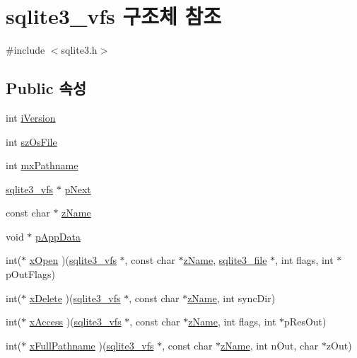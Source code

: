 \hypertarget{structsqlite3__vfs}{}\section{sqlite3\+\_\+vfs 구조체 참조}
\label{structsqlite3__vfs}


{\ttfamily \#include $<$sqlite3.\+h$>$}

\subsection*{Public 속성}
\begin{DoxyCompactItemize}
\item 
int \hyperlink{structsqlite3__vfs_a694dd264949bd163545fe174510ed019}{i\+Version}
\item 
int \hyperlink{structsqlite3__vfs_a549399081342d61134b6398562a0a997}{sz\+Os\+File}
\item 
int \hyperlink{structsqlite3__vfs_adb2d82c74891b00b5529fb94e7710135}{mx\+Pathname}
\item 
\hyperlink{structsqlite3__vfs}{sqlite3\+\_\+vfs} $\ast$ \hyperlink{structsqlite3__vfs_ae795a4417697ecd35163f6cdf0069073}{p\+Next}
\item 
const char $\ast$ \hyperlink{structsqlite3__vfs_a0f06a27ac2201ea04c0623ef19e5d73e}{z\+Name}
\item 
void $\ast$ \hyperlink{structsqlite3__vfs_a1ba832cf207fe59c1fc8eb436524bc35}{p\+App\+Data}
\item 
int($\ast$ \hyperlink{structsqlite3__vfs_ab106b445eb5d372266a1108fc982a9aa}{x\+Open} )(\hyperlink{structsqlite3__vfs}{sqlite3\+\_\+vfs} $\ast$, const char $\ast$\hyperlink{structsqlite3__vfs_a0f06a27ac2201ea04c0623ef19e5d73e}{z\+Name}, \hyperlink{structsqlite3__file}{sqlite3\+\_\+file} $\ast$, int flags, int $\ast$p\+Out\+Flags)
\item 
int($\ast$ \hyperlink{structsqlite3__vfs_a9a84baca80b7ab2da9fb147cb40c73d2}{x\+Delete} )(\hyperlink{structsqlite3__vfs}{sqlite3\+\_\+vfs} $\ast$, const char $\ast$\hyperlink{structsqlite3__vfs_a0f06a27ac2201ea04c0623ef19e5d73e}{z\+Name}, int sync\+Dir)
\item 
int($\ast$ \hyperlink{structsqlite3__vfs_a3a5cc43f1b8a88747eb77db730ce4f69}{x\+Access} )(\hyperlink{structsqlite3__vfs}{sqlite3\+\_\+vfs} $\ast$, const char $\ast$\hyperlink{structsqlite3__vfs_a0f06a27ac2201ea04c0623ef19e5d73e}{z\+Name}, int flags, int $\ast$p\+Res\+Out)
\item 
int($\ast$ \hyperlink{structsqlite3__vfs_ae6573ffda4c4f014960b0ec3a1522dfa}{x\+Full\+Pathname} )(\hyperlink{structsqlite3__vfs}{sqlite3\+\_\+vfs} $\ast$, const char $\ast$\hyperlink{structsqlite3__vfs_a0f06a27ac2201ea04c0623ef19e5d73e}{z\+Name}, int n\+Out, char $\ast$z\+Out)

\end{DoxyCompactItemize}
